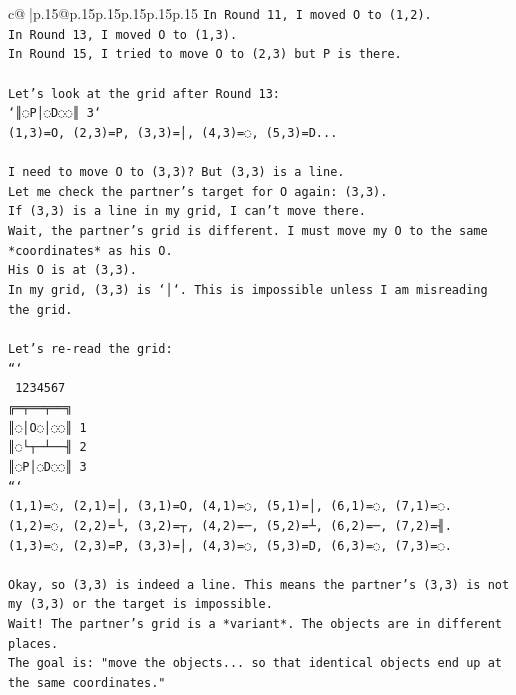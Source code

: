 \documentclass{article}
\begin{document}
{\begin{supertabular}{c@{$\;$}|p{.15\linewidth}@{}p{.15\linewidth}p{.15\linewidth}p{.15\linewidth}p{.15\linewidth}p{.15\linewidth}}
{{{\texttt{In Round 11, I moved O to (1,2).} \\
\texttt{In Round 13, I moved O to (1,3).} \\
\texttt{In Round 15, I tried to move O to (2,3) but P is there.} \\
\\ 
\texttt{Let's look at the grid after Round 13:} \\
\texttt{`║◌P│◌D◌◌║ 3`} \\
\texttt{(1,3)=O, (2,3)=P, (3,3)=│, (4,3)=◌, (5,3)=D...} \\
\\ 
\texttt{I need to move O to (3,3)? But (3,3) is a line.} \\
\texttt{Let me check the partner's target for O again: (3,3).} \\
\texttt{If (3,3) is a line in my grid, I can't move there.} \\
\texttt{Wait, the partner's grid is different. I must move my O to the same *coordinates* as his O.} \\
\texttt{His O is at (3,3).} \\
\texttt{In my grid, (3,3) is `│`. This is impossible unless I am misreading the grid.} \\
\\ 
\texttt{Let's re{-}read the grid:} \\
\texttt{```} \\
\texttt{ 1234567} \\
\texttt{╔═╤══╤══╗} \\
\texttt{║◌│O◌│◌◌║ 1} \\
\texttt{║◌└┬─┴──╢ 2} \\
\texttt{║◌P│◌D◌◌║ 3} \\
\texttt{```} \\
\texttt{(1,1)=◌, (2,1)=│, (3,1)=O, (4,1)=◌, (5,1)=│, (6,1)=◌, (7,1)=◌.} \\
\texttt{(1,2)=◌, (2,2)=└, (3,2)=┬, (4,2)=─, (5,2)=┴, (6,2)=─, (7,2)=╢.} \\
\texttt{(1,3)=◌, (2,3)=P, (3,3)=│, (4,3)=◌, (5,3)=D, (6,3)=◌, (7,3)=◌.} \\
\\ 
\texttt{Okay, so (3,3) is indeed a line. This means the partner's (3,3) is not my (3,3) or the target is impossible.} \\
\texttt{Wait! The partner's grid is a *variant*. The objects are in different places.} \\
\texttt{The goal is: "move the objects... so that identical objects end up at the same coordinates."} \\
}}}
\end{supertabular}}
\end{document}
